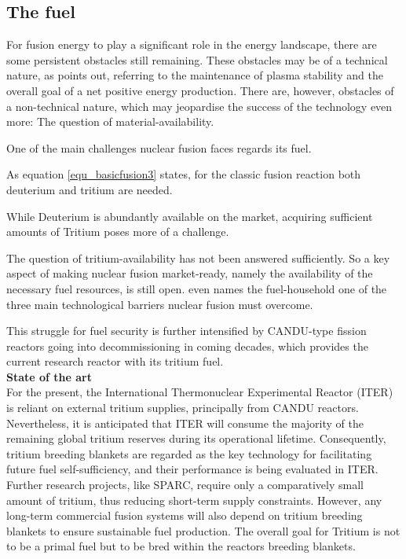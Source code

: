     \subsection{The fuel} 
    \label{subsec_the_fuel}
    For fusion energy to play a significant role in the energy landscape, there are some persistent
    obstacles still remaining. These obstacles may be of a technical nature, as \textcite{katoch2025fusion} points out, referring to the maintenance of plasma stability and the overall goal of a net
    positive energy production. There are, however, obstacles of a non-technical nature, which
    may jeopardise the success of the technology even more: The question of material-availability.

    One of the main challenges nuclear fusion faces regards its fuel. \cite{wimmersNuclearPowerTechnology2026}

    As equation \ref{equ_basicfusion3} states, for the classic fusion reaction both deuterium and tritium are needed.

    While Deuterium is abundantly available on the market, acquiring sufficient amounts of Tritium poses more of a challenge. \cite{katoch2025fusion} \cite{giegerich2019lithium6}

    The question of tritium-availability has not been answered sufficiently. \cite{wimmersNuclearPowerTechnology2026} So a key aspect of making nuclear fusion market-ready, namely the availability of the necessary fuel resources, is still open. \textcite{katoch2025fusion} even names the fuel-household one of the three main technological barriers nuclear fusion must overcome.

    This struggle for fuel security is further intensified by CANDU-type fission reactors going into decommissioning in coming decades, which provides the current research reactor with its tritium fuel. \cite{Pearson2018TritiumSupply}\\ %

    \textbf{State of the art}\\
    For the present, the International Thermonuclear Experimental Reactor (ITER) is reliant on external tritium supplies, principally from CANDU reactors. Nevertheless, it is anticipated that ITER will consume the majority of the remaining global tritium reserves during its operational lifetime. Consequently, tritium breeding blankets are regarded as the key technology for facilitating future fuel self-sufficiency, and their performance is being evaluated in ITER.
    Further research projects, like SPARC, require only a comparatively small amount of tritium, thus reducing short-term supply constraints. However, any long-term commercial fusion systems will also depend on tritium breeding blankets to ensure sustainable fuel production. \cite{wimmersNuclearPowerTechnology2026}
    The overall goal for Tritium is not to be a primal fuel but to be bred within the reactors breeding blankets. \cite{giegerich2019lithium6}
    \newline

